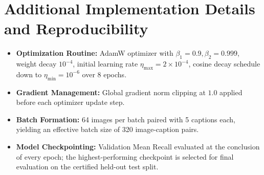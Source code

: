 \documentclass[journal]{IEEEtran}
\begin{document}
\section{Additional Implementation Details and Reproducibility}
\label{sec:supp_reproducibility}
\begin{itemize}
    \item \textbf{Optimization Routine:} AdamW optimizer with $\beta_1=0.9, \beta_2=0.999$, weight decay $10^{-4}$, initial learning rate $\eta_{\text{max}}=2\times 10^{-4}$, cosine decay schedule down to $\eta_{\text{min}}=10^{-6}$ over 8 epochs.
    \item \textbf{Gradient Management:} Global gradient norm clipping at $1.0$ applied before each optimizer update step.
    \item \textbf{Batch Formation:} 64 images per batch paired with 5 captions each, yielding an effective batch size of 320 image-caption pairs.
    \item \textbf{Model Checkpointing:} Validation Mean Recall evaluated at the conclusion of every epoch; the highest-performing checkpoint is selected for final evaluation on the certified held-out test split.
\end{itemize}
\end{document}
